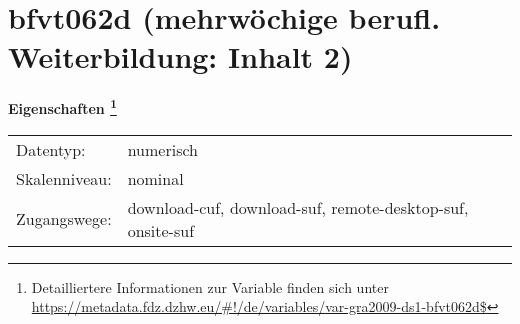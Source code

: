 
    \setcounter{footnote}{0}

    \vspace*{-1.8cm}
	\section{bfvt062d (mehrwöchige berufl. Weiterbildung: Inhalt 2)}
	\label{section:bfvt062d}



    \vspace*{0.5cm}
    \noindent\textbf{Eigenschaften
	\footnote{Detailliertere Informationen zur Variable finden sich unter
		\url{https://metadata.fdz.dzhw.eu/\#!/de/variables/var-gra2009-ds1-bfvt062d$}}}\\
	\begin{tabularx}{\hsize}{@{}lX}
	Datentyp: & numerisch \\
	Skalenniveau: & nominal \\
	Zugangswege: &
	  download-cuf, 
	  download-suf, 
	  remote-desktop-suf, 
	  onsite-suf
 \\
    \end{tabularx}




